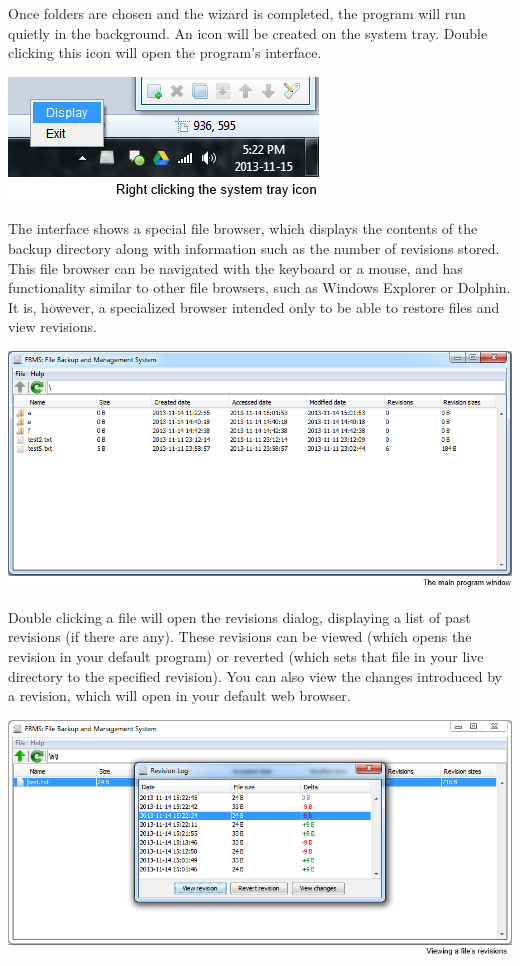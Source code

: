 \documentclass[12pt,a4paper]{article}
\begin{document}
Once folders are chosen and the wizard is completed, the program will run quietly in the background. An icon will be created on the system tray. Double clicking this icon will open the program's interface.

\includegraphics{images/4-systemTray.png}

The interface shows a special file browser, which displays the contents of the backup directory along with information such as the number of revisions stored. This file browser can be navigated with the keyboard or a mouse, and has functionality similar to other file browsers, such as Windows Explorer or Dolphin. It is, however, a specialized browser intended only to be able to restore files and view revisions.

\includegraphics[width=\textwidth]{images/5-mainWindow.png}

Double clicking a file will open the revisions dialog, displaying a list of past revisions (if there are any). These revisions can be viewed (which opens the revision in your default program) or reverted (which sets that file in your live directory to the specified revision). You can also view the changes introduced by a revision, which will open in your default web browser.

\includegraphics[width=\textwidth]{images/6-revisionDialog.png}
\end{document}
